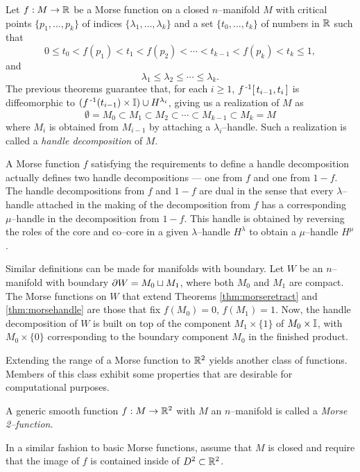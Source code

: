 \begin{defn}
  \label{def:morsehandle}
	Let $f:M\to\mathbb{R}$ be a Morse function on a closed $n$--manifold $M$ with critical points $\{p_1,\dots,p_k\}$ of indices $\{\lambda_1,\dots,\lambda_k\}$ and a set $\{t_0,\dots,t_k\}$ of numbers in $\mathbb{R}$ such that
	\[
		0\leq t_0 < f(p_1) < t_1 < f(p_2) < \cdots < t_{k-1} < f(p_k) < t_k \leq 1,
	\]
	and
	\[
		\lambda_1 \leq \lambda_2 \leq \cdots \leq \lambda_k.
	\]
	The previous theorems guarantee that, for each $i\geq 1$, $f^{\,\text{-}1}[\,t_{i-1},t_i\,]$ is diffeomorphic to $(f^{\,\text{-}1}(t_{i-1})\times\mathbb{I})\cup H^{\lambda_i}$, giving us a realization of $M$ as
	\[
		\emptyset = M_0 \subset M_1 \subset M_2 \subset \cdots \subset M_{k-1} \subset M_k = M
	\]
	where $M_i$ is obtained from $M_{i-1}$ by attaching a $\lambda_i$--handle.
	Such a realization is called a \emph{handle decomposition} of $M$.
\end{defn}

A Morse function $f$ satisfying the requirements to define a handle decomposition actually defines two handle decompositions --- one from $f$ and one from $1-f$.
The handle decompositions from $f$ and $1-f$ are dual in the sense that every $\lambda$--handle attached in the making of the decomposition from $f$ has a corresponding $\mu$--handle in the decomposition from $1-f$.
This handle is obtained by reversing the roles of the core and co--core in a given $\lambda$--handle $H^\lambda$ to obtain a $\mu$--handle $H^\mu$.

Similar definitions can be made for manifolds with boundary.
Let $W$ be an $n$--manifold with boundary $\partial W = M_0\sqcup M_1$, where both $M_0$ and $M_1$ are compact.
The Morse functions on $W$ that extend Theorems \ref{thm:morseretract} and \ref{thm:morsehandle} are those that fix $f(M_0)=0$, $f(M_1)=1$.
Now, the handle decomposition of $W$ is built on top of the component $M_1\times\{1\}$ of $M_0\times\mathbb{I}$, with $M_0\times\{0\}$ corresponding to the boundary component $M_0$ in the finished product.

Extending the range of a Morse function to $\mathbb{R}^2$ yields another class of functions.
Members of this class exhibit some properties that are desirable for computational purposes.

\begin{defn}
	\label{def:morse2function}
	A generic smooth function $f:M\to\mathbb{R}^2$ with $M$ an $n$--manifold is called a \emph{Morse 2--function}.
\end{defn}

In a similar fashion to basic Morse functions, assume that $M$ is closed and require that the image of $f$ is contained inside of $D^2\subset\mathbb{R}^2$.

